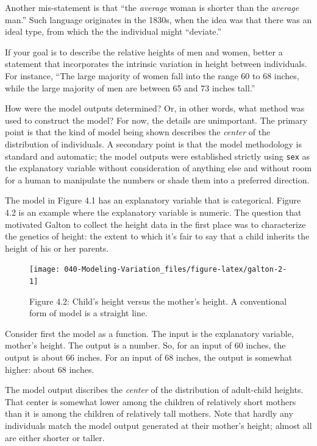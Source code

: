 \documentclass[]{tufte-book}
\begin{document}
Another mis-statement is that ``the \emph{average} woman is shorter than the \emph{average} man.'' Such language originates in the 1830s, when the idea was that there was an ideal type, from which the the individual might ``deviate.''

If your goal is to describe the relative heights of men and women, better a statement that incorporates the intrinsic variation in height between individuals. For instance, ``The large majority of women fall into the range 60 to 68 inches, while the large majority of men are between 65 and 73 inches tall.''

How were the model outputs determined? Or, in other words, what method was used to construct the model? For now, the details are unimportant. The primary point is that the kind of model being shown describes the \emph{center} of the distribution of individuals. A secondary point is that the model methodology is standard and automatic; the model outputs were established strictly using \texttt{sex} as the explanatory variable without consideration of anything else and without room for a human to manipulate the numbers or shade them into a preferred direction.

The model in Figure 4.1 has an explanatory variable that is categorical. Figure 4.2 is an example where the explanatory variable is numeric. The question that motivated Galton to collect the height data in the first place was to characterize the genetics of height: the extent to which it's fair to say that a child inherits the height of his or her parents.

\begin{figure}\texttt{[image: 040-Modeling-Variation\_files/figure-latex/galton-2-1]} \caption[Figure 4.2]{Figure 4.2:  Child's height versus the mother's height. A conventional form of model is a straight line.}\label{fig:galton-2}
\end{figure}

Consider first the model as a function. The input is the explanatory variable, mother's height. The output is a number. So, for an input of 60 inches, the output is about 66 inches. For an input of 68 inches, the output is somewhat higher: about 68 inches.

The model output discribes the \emph{center} of the distribution of adult-child heights. That center is somewhat lower among the children of relatively short mothers than it is among the children of relatively tall mothers. Note that hardly any individuals match the model output generated at their mother's height; almost all are either shorter or taller.
\end{document}
